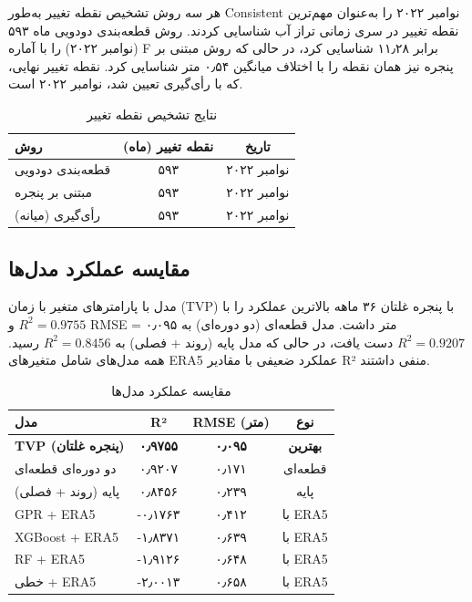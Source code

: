 \documentclass[12pt,a4paper,twocolumn]{article}
\begin{document}
هر سه روش تشخیص نقطه تغییر به‌طور Consistent نوامبر ۲۰۲۲ را به‌عنوان مهم‌ترین نقطه تغییر در سری زمانی تراز آب شناسایی کردند. روش قطعه‌بندی دودویی ماه ۵۹۳ (نوامبر ۲۰۲۲) را با آماره F برابر ۱۱٫۲۸ شناسایی کرد، در حالی که روش مبتنی بر پنجره نیز همان نقطه را با اختلاف میانگین ۰٫۵۴ متر شناسایی کرد. نقطه تغییر نهایی، که با رأی‌گیری تعیین شد، نوامبر ۲۰۲۲ است.

\begin{table}[H]
\centering
\caption{نتایج تشخیص نقطه تغییر}
\label{tab:change_point}
\begin{tabular}{lcc}
\toprule
روش & نقطه تغییر (ماه) & تاریخ \\
\midrule
قطعه‌بندی دودویی & ۵۹۳ & نوامبر ۲۰۲۲ \\
مبتنی بر پنجره & ۵۹۳ & نوامبر ۲۰۲۲ \\
رأی‌گیری (میانه) & ۵۹۳ & نوامبر ۲۰۲۲ \\
\bottomrule
\end{tabular}
\end{table}

\subsection{مقایسه عملکرد مدل‌ها}

مدل با پارامترهای متغیر با زمان (TVP) با پنجره غلتان ۳۶ ماهه بالاترین عملکرد را با $R^2 = 0.9755$ و RMSE = ۰٫۰۹۵ متر داشت. مدل قطعه‌ای (دو دوره‌ای) به $R^2 = 0.9207$ دست یافت، در حالی که مدل پایه (روند + فصلی) به $R^2 = 0.8456$ رسید. همه مدل‌های شامل متغیرهای ERA5 عملکرد ضعیفی با مقادیر R² منفی داشتند.

\begin{table}[H]
\centering
\caption{مقایسه عملکرد مدل‌ها}
\label{tab:model_performance}
\begin{tabular}{lccc}
\toprule
مدل & R² & RMSE (متر) & نوع \\
\midrule
\textbf{TVP (پنجره غلتان)} & \textbf{۰٫۹۷۵۵} & \textbf{۰٫۰۹۵} & \textbf{بهترین} \\
دو دوره‌ای قطعه‌ای & ۰٫۹۲۰۷ & ۰٫۱۷۱ & قطعه‌ای \\
پایه (روند + فصلی) & ۰٫۸۴۵۶ & ۰٫۲۳۹ & پایه \\
GPR + ERA5 & -۰٫۱۷۶۳ & ۰٫۴۱۲ & با ERA5 \\
XGBoost + ERA5 & -۱٫۸۳۷۱ & ۰٫۶۳۹ & با ERA5 \\
RF + ERA5 & -۱٫۹۱۲۶ & ۰٫۶۴۸ & با ERA5 \\
خطی + ERA5 & -۲٫۰۰۱۳ & ۰٫۶۵۸ & با ERA5 \\
\bottomrule
\end{tabular}
\end{table}
\end{document}

